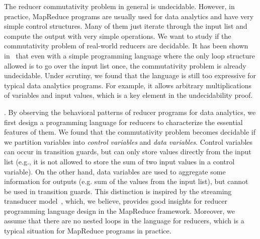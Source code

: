 The reducer commutativity problem in general is undecidable. However, in practice, MapReduce programs are usually used for data analytics and have very simple control structures. Many of them just iterate through the input list and compute the output with very simple operations. We want to study if the commutativity problem of real-world reducers are decidable. It has been shown in~\cite{CHSW15} that even with a simple programming language where  the only loop structure allowed is to go over the input list once, the commutativity problem is already undecidable. Under scrutiny, we found that the language is still too expressive for typical data analytics programs. For example, it allows arbitrary multiplications of variables and input values, which is a key element in the undecidability proof.


\smallskip

.
By observing the behavioral patterns of reducer programs for data analytics, we first design a programming language for reducers to characterize the essential features of them. %
We found that the commutativity problem becomes decidable if we partition variables into \emph{control variables} and \emph{data variables}. Control variables can occur in transition guards, but can only store values directly from the input list (e.g., it is not allowed to store the sum of two input values in a control variable). On the other hand, data variables are used to aggregate some information for outputs (e.g. sum of the values from the input list), but cannot be used in transition guards. This distinction is inspired by the streaming transducer model~\cite{RP11}, which, we believe, provides good insights for reducer programming language design in the MapReduce framework. Moreover, we assume that there are no nested loops in the language for reducers, which is a typical situation for MapReduce programs in practice.

